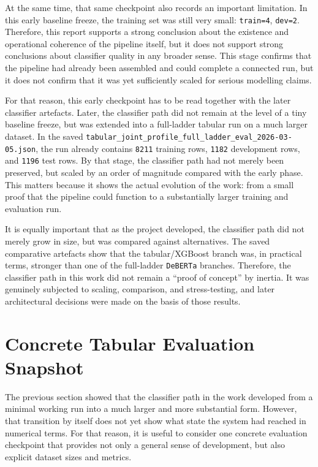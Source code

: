 \documentclass[12pt,a4paper,oneside]{report}
\begin{document}
At the same time, that same checkpoint also records an important limitation. In this early baseline freeze, the training set was still very small: \texttt{train=4}, \texttt{dev=2}. Therefore, this report supports a strong conclusion about the existence and operational coherence of the pipeline itself, but it does not support strong conclusions about classifier quality in any broader sense. This stage confirms that the pipeline had already been assembled and could complete a connected run, but it does not confirm that it was yet sufficiently scaled for serious modelling claims.

For that reason, this early checkpoint has to be read together with the later classifier artefacts. Later, the classifier path did not remain at the level of a tiny baseline freeze, but was extended into a full-ladder tabular run on a much larger dataset. In the saved \texttt{tabular\_joint\_profile\_full\_ladder\_eval\_2026-03-05.json}, the run already contains \texttt{8211} training rows, \texttt{1182} development rows, and \texttt{1196} test rows. By that stage, the classifier path had not merely been preserved, but scaled by an order of magnitude compared with the early phase. This matters because it shows the actual evolution of the work: from a small proof that the pipeline could function to a substantially larger training and evaluation run.

It is equally important that as the project developed, the classifier path did not merely grow in size, but was compared against alternatives. The saved comparative artefacts show that the tabular/XGBoost branch was, in practical terms, stronger than one of the full-ladder \texttt{DeBERTa} branches. Therefore, the classifier path in this work did not remain a ``proof of concept'' by inertia. It was genuinely subjected to scaling, comparison, and stress-testing, and later architectural decisions were made on the basis of those results.

\section{Concrete Tabular Evaluation Snapshot}
The previous section showed that the classifier path in the work developed from a minimal working run into a much larger and more substantial form. However, that transition by itself does not yet show what state the system had reached in numerical terms. For that reason, it is useful to consider one concrete evaluation checkpoint that provides not only a general sense of development, but also explicit dataset sizes and metrics.
\end{document}
